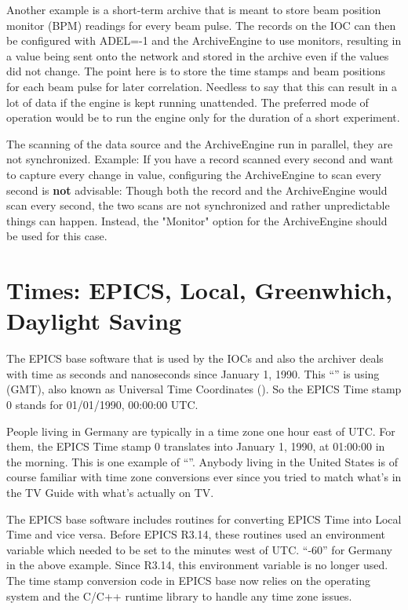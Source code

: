 Another example is a short-term archive that is meant to store
beam position monitor (BPM) readings for every beam pulse. The records
on the IOC can then be configured with ADEL=-1 and the ArchiveEngine
to use monitors, resulting in a value being sent onto the network and
stored in the archive even if the values did not change. The point
here is to store the time stamps and beam positions for each beam
pulse for later correlation. Needless to say that this can result in a
lot of data if the engine is kept running unattended. The preferred
mode of operation would be to run the engine only for the duration
of a short experiment.

\NOTE The scanning of the data source and the ArchiveEngine run in
parallel, they are not synchronized.
Example: If you have a record scanned every second and want to capture
every change in value, configuring the ArchiveEngine to scan every
second is {\bfseries not} advisable:
Though both the record and the ArchiveEngine would scan every
second, the two scans are not synchronized and rather unpredictable
things can happen. Instead, the "Monitor" option for the ArchiveEngine
should be used for this case.

\section{Times: EPICS, Local, Greenwhich, Daylight Saving} \label{sec:GMT}
The EPICS base software that is used by the IOCs and also the archiver
deals with time as seconds and nanoseconds since January 1, 1990.  This
``'' is using  (GMT),
also known as Universal Time Coordinates ().  So the EPICS
Time stamp 0 stands for 01/01/1990, 00:00:00 UTC.

People living in Germany are typically in a time zone one hour east of
UTC. For them, the EPICS Time stamp 0 translates into January 1, 1990,
at 01:00:00 in the morning. This is one example of ``''. Anybody living in the United States is of course familiar
with time zone conversions ever since you tried to match what's in the
TV Guide with what's actually on TV.

The EPICS base software includes routines for converting EPICS Time
into Local Time and vice versa. Before EPICS R3.14, these routines
used an environment variable  which needed
to be set to the minutes west of UTC. ``-60'' for Germany in the above
example. Since R3.14, this environment variable is no longer
used. The time stamp conversion code in EPICS base now relies on the
operating system and the C/C++ runtime library to handle any time zone
issues.

